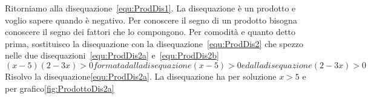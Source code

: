 Ritorniamo alla disequazione~\vref{equ:ProdDis1}. La disequazione è un prodotto e voglio sapere quando  è negativo. Per conoscere il segno di un prodotto bisogna conoscere il segno dei fattori che lo compongono.  Per comodità e quanto detto prima, sostituisco la disequazione con la disequazione~\vref{equ:ProdDis2} che spezzo nelle due disequazioni~\vref{equ:ProdDis2a} e~\vref{equ:ProdDis2b} 
\begin{subequations}
	\begin{equation}
	(x-5)(2-3x)>0\label{equ:ProdDis2}
	\end{equation}
	formata dalla disequazione
	\begin{equation}
	(x-5)>0\label{equ:ProdDis2a}
	\end{equation}
	e dalla disequazione
	\begin{equation}
	(2-3x)>0\label{equ:ProdDis2b}
	\end{equation}
\end{subequations}
Risolvo la disequazione\nobs\vref{equ:ProdDis2a}. La disequazione ha per soluzione $x>5$ e per grafico\nobs\vref{fig:ProdottoDis2a}

